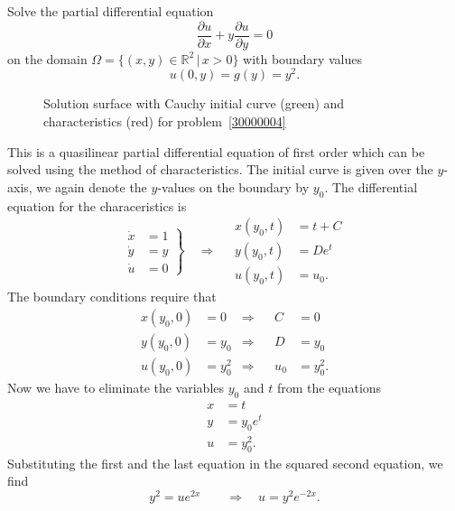 Solve the partial differential equation
\[
\frac{\partial u}{\partial x}+y\frac{\partial u}{\partial y}=0
\]
on the domain
$\Omega=\{(x,y)\in\mathbb R^2\,|\, x> 0\}$ with boundary values
\[
u(0,y)=g(y)=y^2.
\]

\begin{loesung}
\begin{figure}
\centering
{}
\caption{Solution surface with Cauchy initial curve (green) and
characteristics (red) for problem~\ref{30000004}
\label{30000004:solutionfigure}}
\end{figure}
This is a quasilinear partial differential equation of first order
which can be solved using the method of characteristics.
The initial curve is given over the $y$-axis, we again denote the
$y$-values on the boundary by $y_0$.
The differential equation for the characeristics is
\[
\left.
\begin{aligned}
\dot x&=1\\
\dot y&=y\\
\dot u&=0
\end{aligned}
\right\}\quad\Rightarrow\quad
\begin{aligned}
x(y_0,t)&=t+C\\
y(y_0,t)&=De^t\\
u(y_0,t)&=u_0.
\end{aligned}
\]
The boundary conditions require that
\begin{align*}
x(y_0,0)&=0&\Rightarrow&&C&=0\\
y(y_0,0)&=y_0&\Rightarrow&&D&=y_0\\
u(y_0,0)&=y_0^2&\Rightarrow&&u_0&=y_0^2.
\end{align*}
Now we have to eliminate the variables $y_0$ and $t$ from the equations
\begin{align*}
x&=t\\
y&=y_0e^t\\
u&=y_0^2.
\end{align*}
Substituting the first and the last equation in the squared second
equation, we find
\[
y^2=ue^{2x}\qquad\Rightarrow\quad u=y^2e^{-2x}.
\]


\end{loesung}
